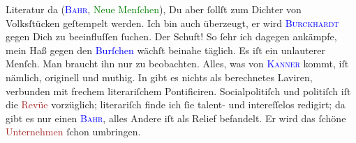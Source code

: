                Literatur da (\textsc{\textcolor{blue}{Bahr}{}\ledrightnote{\textcolor{blue}{Hermann Bahr}}}, \textcolor{green}{Neue Menſchen}{}\ledrightnote{\textcolor{green}{Die neuen Menschen. Ein Schauspiel}}), Du aber ſollſt zum
               Dichter von Volksſtücken geſtempelt werden. Ich bin auch überzeugt, er wird \textsc{\textcolor{blue}{Burckhardt}{}\ledrightnote{\textcolor{blue}{Max Eugen Burckhard}}} gegen Dich zu beeinfluſſen ſuchen. {\pb}Der
               Schuft! So ſehr ich dagegen ankämpfe, mein Haß gegen den \textcolor{blue}{Burſchen}{}\ledrightnote{{$\rightarrow$}\textcolor{blue}{Hermann Bahr}} wächſt beinahe täglich. Es iſt ein
                  \strikeout{\textcolor{gray}{m}}{ } unlauterer Menſch. Man braucht ihn nur \label{K_L02616-10v}\label{K_L02616-10h} zu beobachten. Alles,
               was von \textsc{\textcolor{blue}{Kanner}{}\ledrightnote{\textcolor{blue}{Heinrich Kanner}}} kommt, iſt nämlich, originell und muthig. In \label{K_L02616-11v}\label{K_L02616-11h} gibt es nichts als berechnetes Laviren, verbunden mit
               frechem literariſchem Pontificiren. Socialpolitiſch und politiſch iſt die \textcolor{brown}{Revüe}{}\ledrightnote{{$\rightarrow$}\textcolor{brown}{Die Zeit. Wiener Wochenschrift}} vorzüglich; literariſch
               finde ich ſie talent- und  intereſſelos redigirt;
               da gibt es nur einen \textsc{\textcolor{blue}{Bahr}{}\ledrightnote{\textcolor{blue}{Hermann Bahr}}},  alles Andere iſt als Relief befandelt. Er wird das ſchöne \textcolor{brown}{Unternehmen}{}\ledrightnote{{$\rightarrow$}\textcolor{brown}{Die Zeit. Wiener Wochenschrift}} ſchon umbringen.\pend
           

